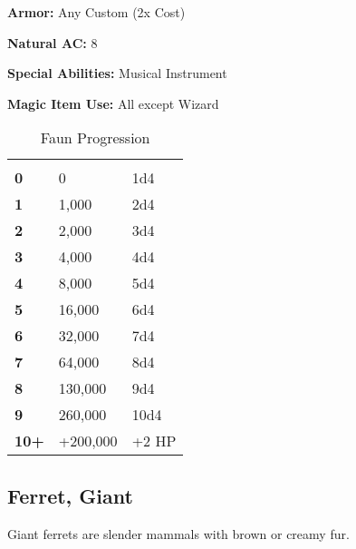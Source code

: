 \begin{multicols*}{2}
{\textbf{Armor:} Any Custom (2x Cost)

\textbf{Natural AC:} 8

\textbf{Special Abilities:} Musical Instrument

\textbf{Magic Item Use:} All except Wizard}

\begin {table}[H]
  \caption{Faun Progression}
  \begin{tabularx}{\columnwidth}{>{\bfseries}YYY}
	 &  & \\
	0 & 0 & 1d4\\
	1 & 1,000 & 2d4\\
	2 & 2,000 & 3d4\\
	3 & 4,000 & 4d4\\
	4 & 8,000 & 5d4\\
	5 & 16,000 & 6d4\\
	6 & 32,000 & 7d4\\
	7 & 64,000 & 8d4\\
	8 & 130,000 & 9d4\\
	9 & 260,000 & 10d4\\
	10+ & +200,000 & +2 HP
  \end {tabularx}
\end {table}

\subsection{Ferret, Giant}

Giant ferrets are slender mammals with brown or creamy fur.


\end{multicols*}
